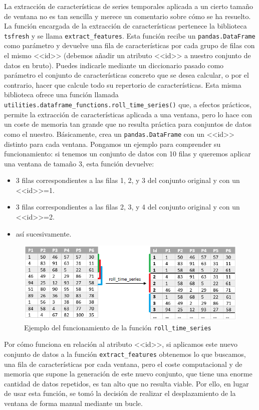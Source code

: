 La extracción de características de series temporales aplicada a un cierto tamaño de ventana no es tan sencilla y merece un comentario sobre cómo se ha resuelto. La función encargada de la extracción de características pertenece la biblioteca \texttt{tsfresh} y se llama \texttt{extract\_features}. Esta función recibe un \texttt{pandas.DataFrame} como parámetro y devuelve una fila de características por cada grupo de filas con el mismo <<id>> (debemos añadir un atributo <<id>> a nuestro conjunto de datos en bruto). Puedes indicarle mediante un diccionario pasado como parámetro el conjunto de características concreto que se desea calcular, o por el contrario, hacer que calcule todo su repertorio de características. Esta misma biblioteca ofrece una función llamada \texttt{utilities.dataframe\_functions.roll\_time\_series()} que, a efectos prácticos, permite la extracción de características aplicada a una ventana, pero lo hace con un coste de memoria tan grande que no resulta práctica para conjuntos de datos como el nuestro. Básicamente, crea un \texttt{pandas.DataFrame} con un <<id>> distinto para cada ventana. Pongamos un ejemplo para comprender su funcionamiento: si tenemos un conjunto de datos con 10 filas y queremos aplicar una ventana de tamaño 3, esta función devuelve: 
\begin{itemize}
	\item 3 filas correspondientes a las filas 1, 2, y 3 del conjunto original y con un <<id>>=1. 
	\item 3 filas correspondientes a las filas 2, 3, y 4 del conjunto original y con un <<id>>=2. 
	\item así sucesivamente. 
\end{itemize}

\begin{figure}[H]
	\centering
	\includegraphics[width=1\textwidth]{../img/rolltimeseries.png}
	\caption{Ejemplo del funcionamiento de la función \texttt{roll\_time\_series}}
	\label{fig:rolltimeseries}
\end{figure}

Por cómo funciona en relación al atributo <<id>>, si aplicamos este nuevo conjunto de datos a la función \texttt{extract\_features} obtenemos lo que buscamos, una fila de características por cada ventana, pero el coste computacional y de memoria que supone la generación de este nuevo conjunto, que tiene una enorme cantidad de datos repetidos, es tan alto que no resulta viable. Por ello, en lugar de usar esta función, se tomó la decisión de realizar el desplazamiento de la ventana de forma manual mediante un bucle.


